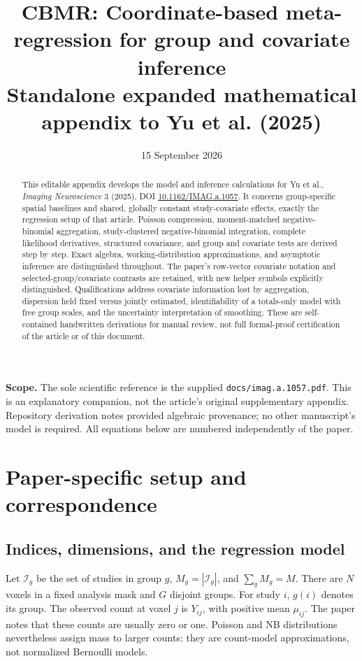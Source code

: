 \documentclass[11pt,a4paper]{article}
\title{CBMR: Coordinate-based meta-regression for group and covariate inference\\
  \large Standalone expanded mathematical appendix to Yu et al. (2025)}
\author{}
\date{15 September 2026}
\numberwithin{equation}{section}
\begin{document}
\maketitle
\begin{abstract}
This editable appendix develops the model and inference calculations for
Yu et al., \emph{Imaging Neuroscience} 3 (2025),
DOI \href{https://doi.org/10.1162/IMAG.a.1057}{10.1162/IMAG.a.1057}.
It concerns group-specific spatial baselines and shared, globally constant
study-covariate effects, exactly the regression setup of that article.
Poisson compression, moment-matched negative-binomial aggregation,
study-clustered negative-binomial integration, complete likelihood
derivatives, structured covariance, and group and covariate tests are
derived step by step. Exact algebra, working-distribution approximations,
and asymptotic inference are distinguished throughout. The paper's
row-vector covariate notation and selected-group/covariate contrasts
are retained, with new helper symbols explicitly distinguished.
Qualifications
address covariate information lost by aggregation, dispersion held fixed
versus jointly estimated, identifiability of a totals-only model with
free group scales, and the uncertainty interpretation of smoothing.
These are self-contained handwritten derivations for manual review, not
full formal-proof certification of the article or of this document.
\end{abstract}
\noindent\textbf{Scope.}
The sole scientific reference is the supplied
\texttt{docs/imag.a.1057.pdf}. This is an explanatory companion, not the
article's original supplementary appendix. Repository derivation notes
provided algebraic provenance; no other manuscript's model is required.
All equations below are numbered independently of the paper.

\tableofcontents
\clearpage

\section{Paper-specific setup and correspondence}\label{sec:setup}

\subsection{Indices, dimensions, and the regression model}
Let $\mathcal I_g$ be the set of studies in group $g$,
$M_g=|\mathcal I_g|$, and $\sum_gM_g=M$.
There are $N$ voxels in a fixed analysis mask and $G$ disjoint groups.
For study $i$, $g(i)$ denotes its group. The observed count at voxel $j$
is $Y_{ij}$, with positive mean $\mu_{ij}$.
The paper notes that these counts are usually zero or one.
Poisson and NB distributions nevertheless assign mass to larger counts:
they are count-model approximations, not normalized Bernoulli models.
\end{document}
